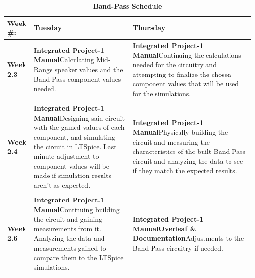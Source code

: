 \begin{table}[h!]
\centering
\captionsetup{justification=centering, labelfont=bf}
\caption{\textbf{Band-Pass Schedule}}
\begin{tabular*}{\textwidth}{@{\extracolsep{\fill}} p{} p{} p{} @{}} 
\toprule
     \textbf{Week \#:} & \textbf{Tuesday} & \textbf{Thursday} \\
     \midrule
     {\textbf{Week 2.3 }}& \textbf{Integrated Project-1 Manual}\newline Calculating Mid-Range speaker values and the Band-Pass component values needed. & \textbf{Integrated Project-1 Manual}\newline Continuing the calculations needed for the circuitry and attempting to finalize the chosen component values that will be used for the simulations.\\
     \vspace{10pt}\\
    {\textbf{Week 2.4}} & \textbf{Integrated Project-1 Manual}\newline Designing said circuit with the gained values of each component, and simulating the circuit in LTSpice. Last minute adjustment to component values will be made if simulation results aren't as expected. & \textbf{Integrated Project-1 Manual}\newline Physically building the circuit and measuring the characteristics of the built Band-Pass circuit and analyzing the data to see if they match the expected results. \\
     \vspace{10pt}\\
     {\textbf{Week 2.6}} & \textbf{Integrated Project-1 Manual}\newline Continuing building the circuit and gaining measurements from it. Analyzing the data and measurements gained to compare them to the LTSpice simulations. & \textbf{Integrated Project-1 Manual\newline Overleaf \& Documentation}\newline Adjustments to the Band-Pass circuitry if needed. \\
     \bottomrule
\end{tabular*}

\label{tab:BandPass schedule}
\end{table}

